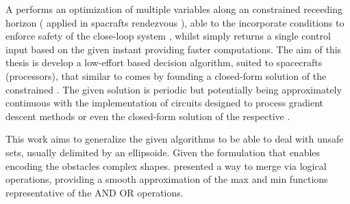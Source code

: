 
A  performs an optimization of multiple variables along an constrained receeding horizon ( applied in spacrafts rendezvous \cite{hartley2015tutorial, kaczmarek2023autonomous}), able to the incorporate  conditions to enforce safety of the close-loop system  \cite{grandia2021multi}, whilst  simply returns a single control input based on the given instant providing  faster computations.
The aim of this thesis is develop a low-effort  based decision algorithm, suited to spacecrafts (processors), that similar to \cite{matias2025hybrid, reis2020control} comes by founding a closed-form solution of the constrained . The given solution is periodic but potentially being approximately continuous with the implementation of circuits designed to process gradient descent methods or even the closed-form solution of the respective  \cite{hao2025analysis}.


This work aims to generalize the given algorithms to be able to deal with unsafe sets, usually delimited by an ellipsoide. Given the  formulation that enables encoding the obstacles complex shapes. \cite{molnar2023composing} presented a way to merge  via logical operations, providing a smooth approximation of the max and min functions representative of the AND OR operations.  

